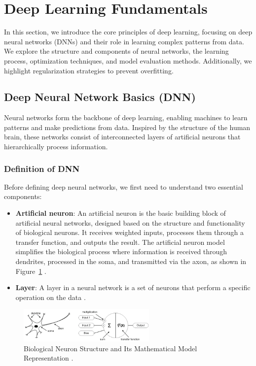 \section{Deep Learning Fundamentals}
In this section, we introduce the core principles of deep learning, focusing on deep neural networks (DNNs) and their role in learning complex patterns from data. We explore the structure and components of neural networks, the learning process, optimization techniques, and model evaluation methods. Additionally, we highlight regularization strategies to prevent overfitting.

\subsection{Deep Neural Network Basics (DNN)}
Neural networks form the backbone of deep learning, enabling machines to learn patterns and make predictions from data. Inspired by the structure of the human brain, these networks consist of interconnected layers of artificial neurons that hierarchically process information.

\subsubsection{Definition of DNN}

Before defining deep neural networks, we first need to understand two essential components: 
\begin{itemize}
    \item \textbf{Artificial neuron}: An artificial neuron is the basic building block of artificial neural networks, designed based on the structure and functionality of biological neurons. It receives weighted inputs, processes them through a transfer function, and outputs the result. The artificial neuron model simplifies the biological process where information is received through dendrites, processed in the soma, and transmitted via the axon, as shown in Figure~\ref{fig:figure01} \parencite{krenker2011introduction}.
    
    \item \textbf{Layer}: A layer in a neural network is a set of neurons that perform a specific operation on the data \parencite{bengio2017deep}.
\end{itemize}

\begin{figure}[H] %
    \centering
    \includegraphics[width=0.6\textwidth]{chapters/chapter1/images/Figure01.png}
    \caption{Biological Neuron Structure and Its Mathematical Model Representation \parencite{krenker2011introduction}.}
    \label{fig:figure01}
\end{figure}


